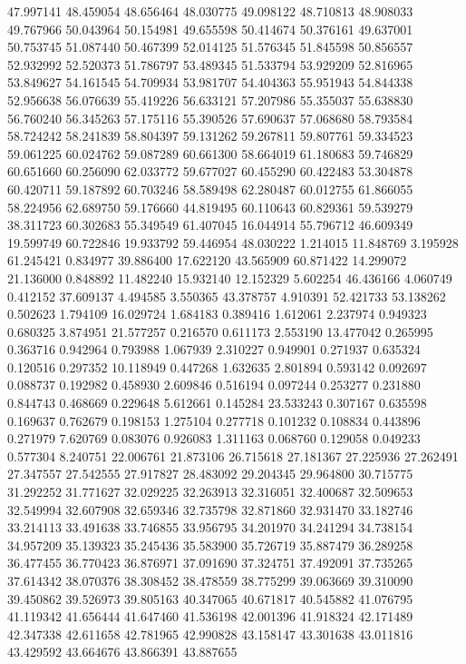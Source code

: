 47.997141
48.459054
48.656464
48.030775
49.098122
48.710813
48.908033
49.767966
50.043964
50.154981
49.655598
50.414674
50.376161
49.637001
50.753745
51.087440
50.467399
52.014125
51.576345
51.845598
50.856557
52.932992
52.520373
51.786797
53.489345
51.533794
53.929209
52.816965
53.849627
54.161545
54.709934
53.981707
54.404363
55.951943
54.844338
52.956638
56.076639
55.419226
56.633121
57.207986
55.355037
55.638830
56.760240
56.345263
57.175116
55.390526
57.690637
57.068680
58.793584
58.724242
58.241839
58.804397
59.131262
59.267811
59.807761
59.334523
59.061225
60.024762
59.087289
60.661300
58.664019
61.180683
59.746829
60.651660
60.256090
62.033772
59.677027
60.455290
60.422483
53.304878
60.420711
59.187892
60.703246
58.589498
62.280487
60.012755
61.866055
58.224956
62.689750
59.176660
44.819495
60.110643
60.829361
59.539279
38.311723
60.302683
55.349549
61.407045
16.044914
55.796712
46.609349
19.599749
60.722846
19.933792
59.446954
48.030222
1.214015
11.848769
3.195928
61.245421
0.834977
39.886400
17.622120
43.565909
60.871422
14.299072
21.136000
0.848892
11.482240
15.932140
12.152329
5.602254
46.436166
4.060749
0.412152
37.609137
4.494585
3.550365
43.378757
4.910391
52.421733
53.138262
0.502623
1.794109
16.029724
1.684183
0.389416
1.612061
2.237974
0.949323
0.680325
3.874951
21.577257
0.216570
0.611173
2.553190
13.477042
0.265995
0.363716
0.942964
0.793988
1.067939
2.310227
0.949901
0.271937
0.635324
0.120516
0.297352
10.118949
0.447268
1.632635
2.801894
0.593142
0.092697
0.088737
0.192982
0.458930
2.609846
0.516194
0.097244
0.253277
0.231880
0.844743
0.468669
0.229648
5.612661
0.145284
23.533243
0.307167
0.635598
0.169637
0.762679
0.198153
1.275104
0.277718
0.101232
0.108834
0.443896
0.271979
7.620769
0.083076
0.926083
1.311163
0.068760
0.129058
0.049233
0.577304
8.240751
22.006761
21.873106
26.715618
27.181367
27.225936
27.262491
27.347557
27.542555
27.917827
28.483092
29.204345
29.964800
30.715775
31.292252
31.771627
32.029225
32.263913
32.316051
32.400687
32.509653
32.549994
32.607908
32.659346
32.735798
32.871860
32.931470
33.182746
33.214113
33.491638
33.746855
33.956795
34.201970
34.241294
34.738154
34.957209
35.139323
35.245436
35.583900
35.726719
35.887479
36.289258
36.477455
36.770423
36.876971
37.091690
37.324751
37.492091
37.735265
37.614342
38.070376
38.308452
38.478559
38.775299
39.063669
39.310090
39.450862
39.526973
39.805163
40.347065
40.671817
40.545882
41.076795
41.119342
41.656444
41.647460
41.536198
42.001396
41.918324
42.171489
42.347338
42.611658
42.781965
42.990828
43.158147
43.301638
43.011816
43.429592
43.664676
43.866391
43.887655
